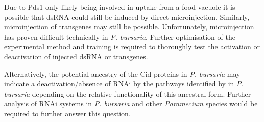 Due to Pds1 only likely being involved in uptake from a food vacuole it is possible
that dsRNA could still be induced by direct microinjection.  Similarly, 
microinjection of transgenes may still be possible.  Unfortunately, microinjection
has proven difficult technically in \textit{P. bursaria}.  Further optimisation
of the experimental method and training is required to thoroughly test
the activation or deactivation of injected dsRNA or transgenes.

Alternatively, the potential ancestry of the Cid proteins in \textit{P. bursaria}
may indicate a deactivation/absence
of RNAi by the pathways identified by \citep{Marker2014} in \textit{P. bursaria}
depending on the relative functionality of this ancestral form.
Further analysis of RNAi systems in \textit{P. bursaria} and other \textit{Paramecium}
species would be required to further answer this question.

